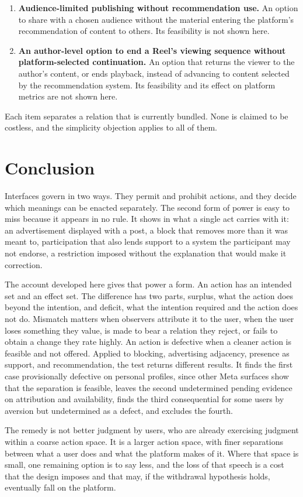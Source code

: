 \begin{enumerate}
  \item \textbf{Audience-limited publishing without recommendation use.} An option to share with a chosen audience without the material entering the platform's recommendation of content to others. Its feasibility is not shown here.
  \item \textbf{An author-level option to end a Reel's viewing sequence without platform-selected continuation.} An option that returns the viewer to the author's content, or ends playback, instead of advancing to content selected by the recommendation system. Its feasibility and its effect on platform metrics are not shown here.
\end{enumerate}

Each item separates a relation that is currently bundled. None is claimed to be costless, and the simplicity objection applies to all of them.

\section{Conclusion}\label{sec:conclusion}

Interfaces govern in two ways. They permit and prohibit actions, and they decide which meanings can be enacted separately. The second form of power is easy to miss because it appears in no rule. It shows in what a single act carries with it: an advertisement displayed with a post, a block that removes more than it was meant to, participation that also lends support to a system the participant may not endorse, a restriction imposed without the explanation that would make it correction.

The account developed here gives that power a form. An action has an intended set and an effect set. The difference has two parts, surplus, what the action does beyond the intention, and deficit, what the intention required and the action does not do. Mismatch matters when observers attribute it to the user, when the user loses something they value, is made to bear a relation they reject, or fails to obtain a change they rate highly. An action is defective when a cleaner action is feasible and not offered. Applied to blocking, advertising adjacency, presence as support, and recommendation, the test returns different results. It finds the first case provisionally defective on personal profiles, since other Meta surfaces show that the separation is feasible, leaves the second undetermined pending evidence on attribution and availability, finds the third consequential for some users by aversion but undetermined as a defect, and excludes the fourth.

The remedy is not better judgment by users, who are already exercising judgment within a coarse action space. It is a larger action space, with finer separations between what a user does and what the platform makes of it. Where that space is small, one remaining option is to say less, and the loss of that speech is a cost that the design imposes and that may, if the withdrawal hypothesis holds, eventually fall on the platform.
